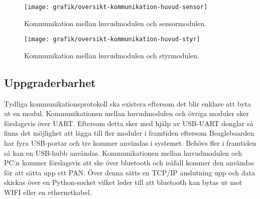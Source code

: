 \begin{figure}[h]
\center
\texttt{[image: grafik/oversikt-kommunikation-huvud-sensor]}
\caption{Kommunikation mellan huvudmodulen och sensormodulen.}
\end{figure}

\begin{figure}[h]
\center
\texttt{[image: grafik/oversikt-kommunikation-huvud-styr]}
\caption{Kommunikation mellan huvudmodulen och styrmodulen.}
\end{figure}

\subsection{Uppgraderbarhet}
Tydliga kommunikationsprotokoll ska existera eftersom det blir enklare att byta ut en modul. Kommunikationen mellan huvudmodulen och övriga moduler sker förslagsvis över UART. Eftersom detta sker med hjälp av USB-UART donglar så finns det möjlighet att lägga till fler moduler i framtiden eftersom Beagleboarden har fyra USB-portar och tre kommer användas i systemet. Behövs fler i framtiden så kan en USB-hubb användas.
\newline
\newline
Kommunikationen mellan huvudmodulen och PC:n kommer förslagsvis att ske över bluetooth och isåfall kommer den användas för att sätta upp ett PAN. Över denna sätts en TCP/IP anslutning upp och data skickas över en Python-socket vilket leder till att bluetooth kan bytas ut mot WIFI eller en ethernetkabel.
